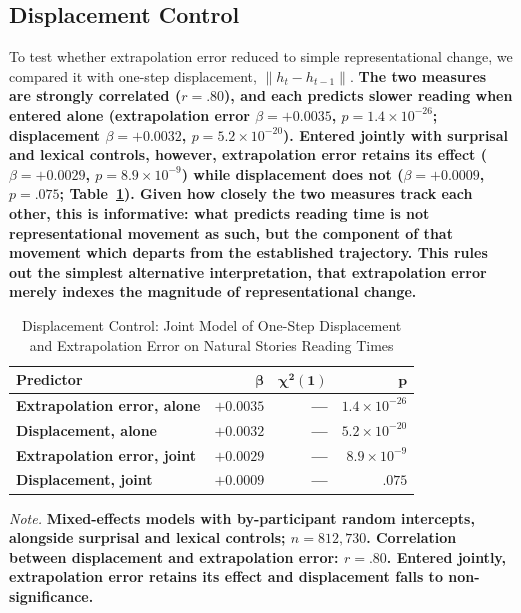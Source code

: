 \documentclass[12pt]{article}
\newcommand{\new}[1]{{\bfseries #1}}
\begin{document}
\subsection{Displacement Control}

To test whether extrapolation error reduced to simple representational change, we compared it with one-step displacement, $\|h_t - h_{t-1}\|$. \new{The two measures are strongly correlated ($r = .80$), and each predicts slower reading when entered alone (extrapolation error $\beta = +0.0035$, $p = 1.4 \times 10^{-26}$; displacement $\beta = +0.0032$, $p = 5.2 \times 10^{-20}$). Entered jointly with surprisal and lexical controls, however, extrapolation error retains its effect ($\beta = +0.0029$, $p = 8.9 \times 10^{-9}$) while displacement does not ($\beta = +0.0009$, $p = .075$; Table~\ref{tab:displacement}). Given how closely the two measures track each other, this is informative: what predicts reading time is not representational movement as such, but the component of that movement which departs from the established trajectory. This rules out the simplest alternative interpretation, that extrapolation error merely indexes the magnitude of representational change.}

\begin{table}[!htbp]
\centering
\caption{Displacement Control: Joint Model of One-Step Displacement and Extrapolation Error on Natural Stories Reading Times}
\label{tab:displacement}
\begin{tabular}{lrrr}
\toprule
\textbf{Predictor} & $\boldsymbol{\beta}$ & $\boldsymbol{\chi^2(1)}$ & $\boldsymbol{p}$ \\
\midrule
\new{Extrapolation error, alone} & \new{$+0.0035$} & \new{---} & \new{$1.4 \times 10^{-26}$} \\
\new{Displacement, alone} & \new{$+0.0032$} & \new{---} & \new{$5.2 \times 10^{-20}$} \\
\new{Extrapolation error, joint} & \new{$+0.0029$} & \new{---} & \new{$8.9 \times 10^{-9}$} \\
\new{Displacement, joint} & \new{$+0.0009$} & \new{---} & \new{$.075$} \\
\bottomrule
\end{tabular}

\smallskip
\footnotesize
\textit{Note.} \new{Mixed-effects models with by-participant random intercepts, alongside surprisal and lexical controls; $n = 812{,}730$. Correlation between displacement and extrapolation error: $r = .80$. Entered jointly, extrapolation error retains its effect and displacement falls to non-significance.}
\end{table}
\end{document}
